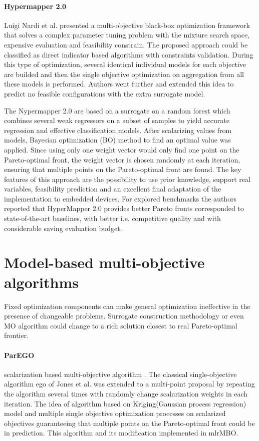         \paragraph{Hypermapper 2.0} Luigi Nardi et al. \cite{nardi2019practical} presented a multi-objective black-box optimization framework that solves a complex parameter tuning problem with the mixture search space, expensive evaluation and feasibility constrain.
        The proposed approach could be classified as direct indicator based algorithms with constraints validation. During this type of optimization, several identical individual models for each objective are builded and then the single objective optimization on aggregation from all these models is performed. Authors went further and extended this idea to predict no feasible configurations with the extra surrogate model.
        
        The Nypermapper 2.0 are based on a surrogate on a random forest which combines several weak regressors on a subset of samples to yield accurate regression and effective classification models. After scalarizing values from models, Bayesian optimization (BO) method to find an optimal value was applied. Since using only one weight vector would only find one point on the Pareto-optimal front, the weight vector is chosen randomly at each iteration, ensuring that multiple points on the Pareto-optimal front are found. The key features of this approach are the possibility to use prior knowledge, support real variables, feasibility prediction and an excellent final adaptation of the implementation to embedded devices. For explored benchmarks the authors reported that HyperMapper 2.0 provides better Pareto fronts corresponded to state-of-the-art baselines, with better i.e. competitive quality and with considerable saving evaluation budget.
        

    \section{Model-based multi-objective algorithms}
        Fixed optimization components can make general optimization ineffective in the presence of changeable problems. Surrogate construction methodology or even MO algorithm could change to a rich solution closest to real Pareto-optimal frontier.

        \paragraph{ParEGO}\label{alg:ParEGO} scalarization based multi-objective algorithm \cite{Knowles06}. The classical single-objective algorithm \gls{ego} \cite{JonesSW98} of Jones et al. was extended to a multi-point proposal by repeating the algorithm several times with randomly change scalarization weights in each iteration.  The idea of algorithm based on Kriging(Gaussian process regression) model and multiple single objective optimization processes on scalarized objectives guaranteeing that multiple points on the Pareto-optimal front could be in prediction. This algorithm and its modification implemented in mlrMBO\cite{BischlmlrMBO}.


